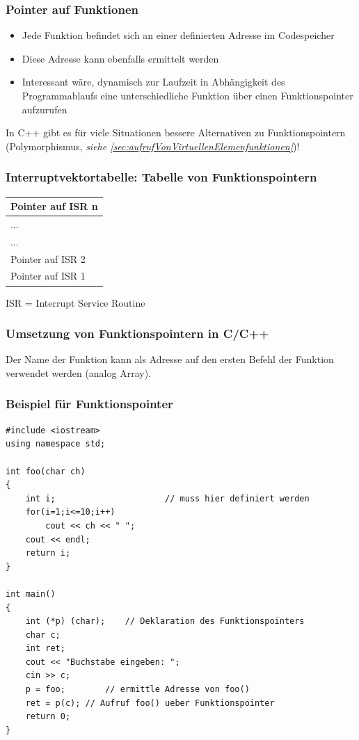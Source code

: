 \subsubsection{Pointer auf Funktionen}
\begin{itemize}
	\item Jede Funktion befindet sich an einer definierten Adresse im Codespeicher
	\item Diese Adresse kann ebenfalls ermittelt werden
	\item Interessant wäre, dynamisch zur Laufzeit in Abhängigkeit des Programmablaufs eine unterschiedliche Funktion über einen Funktionspointer aufzurufen
\end{itemize}
\begin{hinweis}
In C++ gibt es für viele Situationen bessere Alternativen zu Funktionspointern (Polymorphismus, \emph{siehe \ref{sec:aufrufVonVirtuellenElemenfunktionen}})!
\end{hinweis}

\subsubsection{Interruptvektortabelle: Tabelle von Funktionspointern}
\centering
\begin{tabularx}{0.25\textwidth}{|X|}
	\hline
	Pointer auf ISR n\\
	\hline
	...\\
	\hline
	...\\
	\hline
	Pointer auf ISR 2\\
	\hline
	Pointer auf ISR 1\\
	\hline
\end{tabularx}
\flushleft
ISR = Interrupt Service Routine

\subsubsection{Umsetzung von Funktionspointern in C/C++}
Der Name der Funktion kann als Adresse auf den ersten Befehl der Funktion verwendet werden (analog Array).

\subsubsection{Beispiel für Funktionspointer}
\noindent
\begin{minipage}{0.7\linewidth}
\begin{lstlisting}
#include <iostream>
using namespace std;

int foo(char ch)
{
	int i;						// muss hier definiert werden
	for(i=1;i<=10;i++)
		cout << ch << " ";
	cout << endl;
	return i;
}

int main()
{
	int (*p) (char);	// Deklaration des Funktionspointers
	char c;
	int ret;
	cout << "Buchstabe eingeben: ";
	cin >> c;
	p = foo;		// ermittle Adresse von foo()
	ret = p(c);	// Aufruf foo() ueber Funktionspointer
	return 0;
}
\end{lstlisting}
\end{minipage}

